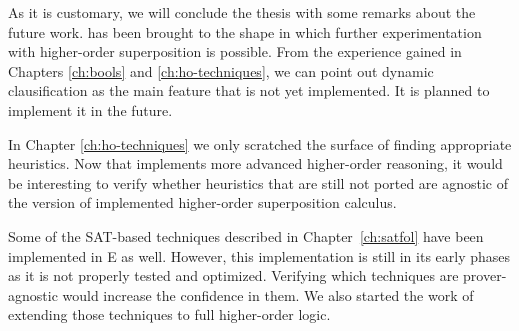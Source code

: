 As it is customary, we will conclude the thesis with some remarks about the
future work. \ehohii{} has been brought to the shape in which further
experimentation with higher-order superposition is possible. From the experience
gained in Chapters \ref{ch:bools} and \ref{ch:ho-techniques}, we can point out
dynamic clausification as the main feature that is not yet implemented. It is planned to implement it in the future.

In Chapter \ref{ch:ho-techniques} we only scratched the surface of finding
appropriate heuristics. Now that \ehohii{} implements more advanced higher-order
reasoning, it would be interesting to verify whether heuristics that are still not
ported are agnostic of the version of implemented higher-order superposition
calculus. 

Some of the SAT-based techniques described in Chapter~\ref{ch:satfol} have been
implemented in E as well. However, this implementation is still in its early
phases as it is not properly tested and optimized. Verifying which techniques are
prover-agnostic would increase the confidence in them. We also started the work
of extending those techniques to full higher-order logic.
